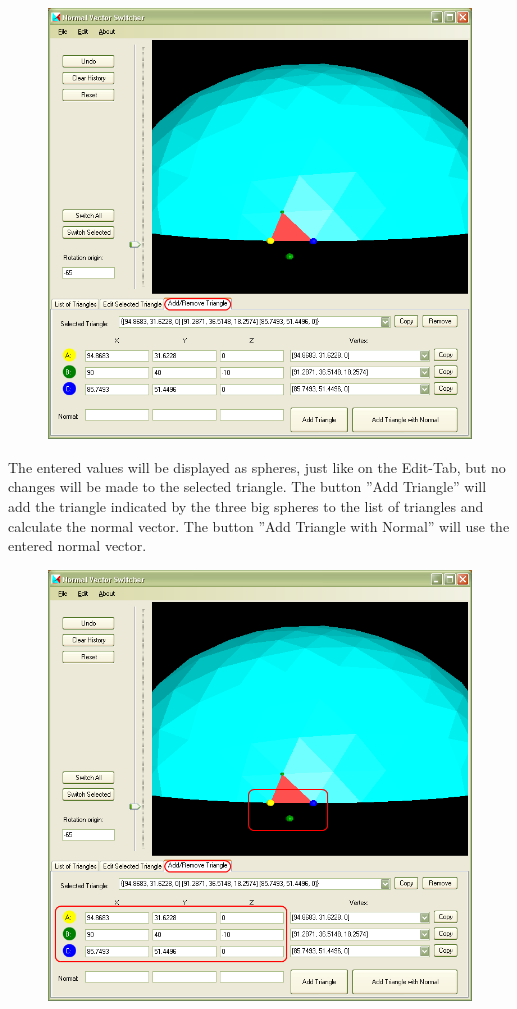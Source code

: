 \begin{figure}[htb]
	\centering
	\includegraphics[width=0.9\linewidth]{window9}
\end{figure}

\newpage
\noindent
The entered values will be displayed as spheres, just like on the Edit-Tab, but no changes will be made to the selected triangle. The button ''Add Triangle'' will add the triangle indicated by the three big spheres to the list of triangles and calculate the normal vector. The button ''Add Triangle with Normal'' will use the entered normal vector.

\begin{figure}[htb]
	\centering
	\includegraphics[width=0.9\linewidth]{window10}
\end{figure}

